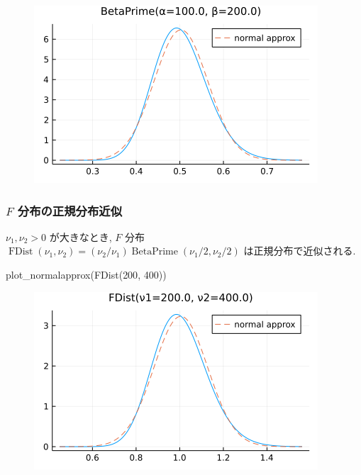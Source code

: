 \documentclass[
  letterpaper,
  DIV=11,
  numbers=noendperiod]{scrartcl}
\newenvironment{Shaded}{\begin{snugshade}}{\end{snugshade}}
\newcommand{\FloatTok}[1]{\textcolor[rgb]{0.68,0.00,0.00}{#1}}
\newcommand{\FunctionTok}[1]{\textcolor[rgb]{0.28,0.35,0.67}{#1}}
\newcommand{\NormalTok}[1]{\textcolor[rgb]{0.00,0.23,0.31}{#1}}
\begin{document}
\begin{figure}[H]

{\centering \includegraphics{05 Central limit theorem_files/figure-pdf/cell-127-output-1.png}

}

\end{figure}

\hypertarget{f-ux5206ux5e03ux306eux6b63ux898fux5206ux5e03ux8fd1ux4f3c}{%
\subsubsection{\texorpdfstring{\(F\)
分布の正規分布近似}{F 分布の正規分布近似}}\label{f-ux5206ux5e03ux306eux6b63ux898fux5206ux5e03ux8fd1ux4f3c}}

\(\nu_1,\nu_2>0\) が大きなとき, \(F\) 分布
\(\operatorname{FDist}(\nu_1, \nu_2) = (\nu_2/\nu_1)\operatorname{BetaPrime}(\nu_1/2, \nu_2/2)\)
は正規分布で近似される.

\begin{Shaded}
\begin{Highlighting}[]
\FunctionTok{plot\_normalapprox}\NormalTok{(}\FunctionTok{FDist}\NormalTok{(}\FloatTok{200}\NormalTok{, }\FloatTok{400}\NormalTok{))}
\end{Highlighting}
\end{Shaded}

\begin{figure}[H]

{\centering \includegraphics{05 Central limit theorem_files/figure-pdf/cell-128-output-1.png}

}

\end{figure}
\end{document}

